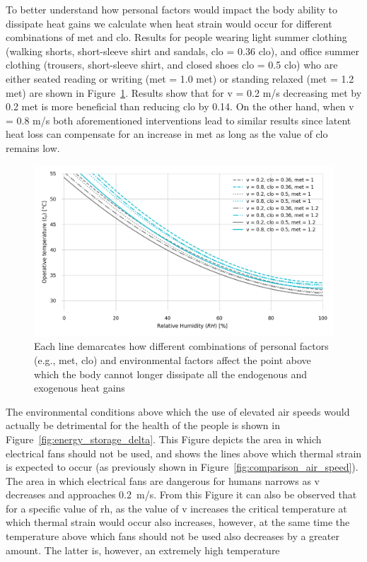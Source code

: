 To better understand how personal factors would impact the body ability to dissipate heat gains we calculate when heat strain would occur for different combinations of \ac{met} and \ac{clo}.
Results for people wearing light summer clothing (walking shorts, short-sleeve shirt and sandals, \acs{clo} = 0.36 clo), and office summer clothing (trousers, short-sleeve shirt, and closed shoes \acs{clo} = 0.5 clo) who are either seated reading or writing (\ac{met} = 1.0 met) or standing relaxed (\ac{met} = 1.2 met) are shown in Figure~\ref{fig:met_clo}.
Results show that for \ac{v} = 0.2 m/s decreasing \ac{met} by 0.2 met is more beneficial than reducing \ac{clo} by 0.14.
On the other hand, when \ac{v} = 0.8 m/s both aforementioned interventions lead to similar results since latent heat loss can compensate for an increase in \ac{met} as long as the value of \ac{clo} remains low.

\begin{figure}[b!]
    \centering
    \includegraphics[width=\textwidth]{figures/met_clo.png}
    \caption{Each line demarcates how different combinations of personal factors (e.g., \ac{met}, \ac{clo}) and environmental factors affect the point above which the body cannot longer dissipate all the endogenous and exogenous heat gains}
    \label{fig:met_clo}
\end{figure}

The environmental conditions above which the use of elevated air speeds would actually be detrimental for the health of the people is shown in Figure~\ref{fig:energy_storage_delta}.
This Figure depicts the area in which electrical fans should not be used, and shows the lines above which thermal strain is expected to occur (as previously shown in Figure~\ref{fig:comparison_air_speed}).
The area in which electrical fans are dangerous for humans narrows as \ac{v} decreases and approaches 0.2~m/s.
From this Figure it can also be observed that for a specific value of \ac{rh}, as the value of \ac{v} increases the critical temperature at which thermal strain would occur also increases, however, at the same time the temperature above which fans should not be used also decreases by a greater amount.
The latter is, however, an extremely high temperature

